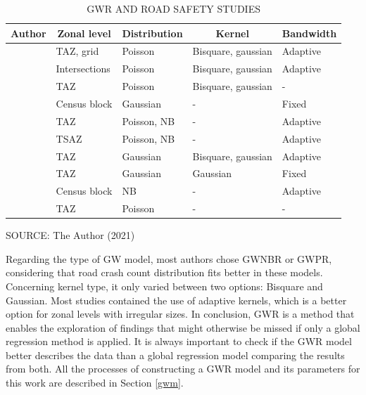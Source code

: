 \begin{table}[!htbp]
    \footnotesize
    \captionsetup{justification=raggedright,
        singlelinecheck=false,
        font=footnotesize}
    \caption{GWR AND ROAD SAFETY STUDIES}
    \centering
    \begin{tabular}{lllp{1.6cm}l}
        \hline
        \multicolumn{1}{c}{\textbf{Author}} & \multicolumn{1}{c}{\textbf{Zonal level}} & \multicolumn{1}{c}{\textbf{Distribution}} & \multicolumn{1}{c}{\textbf{Kernel}} & \multicolumn{1}{c}{\textbf{Bandwidth}} \\
        \hline 
        \textcite{Amoh-Gyimah2017} & TAZ, grid & Poisson & Bisquare, gaussian & Adaptive \\
        \textcite{Arvin2019} & Intersections & Poisson & Bisquare, gaussian & Adaptive \\
        \textcite{Hadayeghi2010} & TAZ & Poisson & Bisquare, gaussian & - \\
        \textcite{Huang2018} & Census block & Gaussian & - & Fixed \\
        \textcite{Obelheiro2019} & TAZ & Poisson, NB & - & Adaptive \\
        \textcite{Obelheiro2020} & TSAZ & Poisson, NB & - & Adaptive \\
        \textcite{Pirdavani2014} & TAZ & Gaussian & Bisquare, gaussian & Adaptive \\
        \textcite{Rhee2016} & TAZ & Gaussian & Gaussian & Fixed \\
        \textcite{Yu2017} & Census block & NB & - & Adaptive \\
        \textcite{Zhang2015} & TAZ & Poisson & - & - \\
        \hline
    \end{tabular}
    \label{tab:gwrworks}
    \par \vspace{2mm} \footnotesize \raggedright
    SOURCE: The Author (2021)
\end{table}

Regarding the type of GW model, most authors chose GWNBR or GWPR, considering that road crash count distribution fits better in these models. Concerning kernel type, it only varied between two options: Bisquare and Gaussian. Most studies contained the use of adaptive kernels, which is a better option for zonal levels with irregular sizes. In conclusion, GWR is a method that enables the exploration of findings that might otherwise be missed if only a global regression method is applied. It is always important to check if the GWR model better describes the data than a global regression model comparing the results from both. All the processes of constructing a GWR model and its parameters for this work are described in Section \ref{gwm}.


